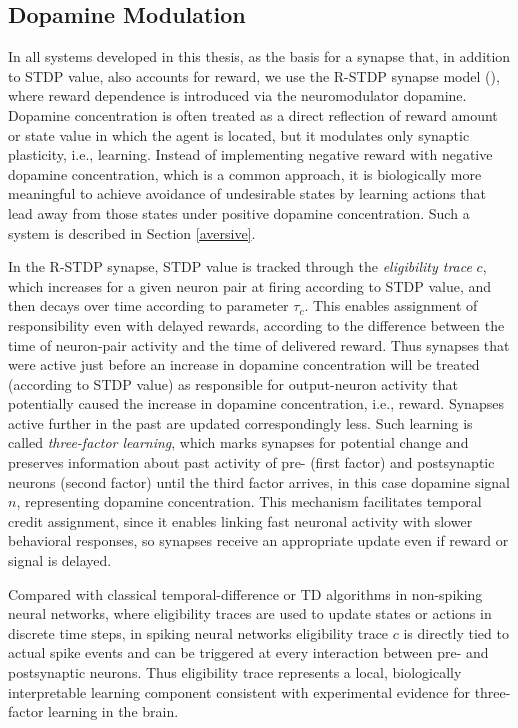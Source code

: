 \documentclass[a4paper,12pt,openright]{book}
\begin{document}
\subsection{Dopamine Modulation}
In all systems developed in this thesis, as the basis for a synapse that, in addition to STDP value, also accounts for reward, we use the R-STDP synapse model (\citet{distalReward}), where reward dependence is introduced via the neuromodulator dopamine. Dopamine concentration is often treated as a direct reflection of reward amount or state value in which the agent is located, but it modulates only synaptic plasticity, i.e., learning. Instead of implementing negative reward with negative dopamine concentration, which is a common approach, it is biologically more meaningful to achieve avoidance of undesirable states by learning actions that lead away from those states under positive dopamine concentration. Such a system is described in Section \ref{aversive}. 

In the R-STDP synapse, STDP value is tracked through the \emph{eligibility trace} \(c\), which increases for a given neuron pair at firing according to STDP value, and then decays over time according to parameter $\tau_c$. This enables assignment of responsibility even with delayed rewards, according to the difference between the time of neuron-pair activity and the time of delivered reward. Thus synapses that were active just before an increase in dopamine concentration will be treated (according to STDP value) as responsible for output-neuron activity that potentially caused the increase in dopamine concentration, i.e., reward. Synapses active further in the past are updated correspondingly less. Such learning is called \textit{three-factor learning}, which marks synapses for potential change and preserves information about past activity of pre- (first factor) and postsynaptic neurons (second factor) until the third factor arrives, in this case dopamine signal \(n\), representing dopamine concentration. This mechanism facilitates temporal credit assignment, since it enables linking fast neuronal activity with slower behavioral responses, so synapses receive an appropriate update even if reward or signal is delayed.

Compared with classical temporal-difference or TD algorithms in non-spiking neural networks, where eligibility traces are used to update states or actions in discrete time steps, in spiking neural networks eligibility trace \(c\) is directly tied to actual spike events and can be triggered at every interaction between pre- and postsynaptic neurons. Thus eligibility trace represents a local, biologically interpretable learning component consistent with experimental evidence for three-factor learning in the brain.
\end{document}
